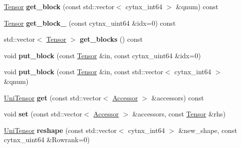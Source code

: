 \begin{DoxyCompactItemize}
\hyperlink{classcytnx_1_1Tensor}{Tensor} {\bfseries get\+\_\+block} (const std\+::vector$<$ cytnx\+\_\+int64 $>$ \&qnum) const
\item 
\mbox{\label{classcytnx_1_1UniTensor_a216d54f936554fa11b1edaff968d69d4}} 
\hyperlink{classcytnx_1_1Tensor}{Tensor} {\bfseries get\+\_\+block\+\_\+} (const cytnx\+\_\+uint64 \&idx=0) const
\item 
\mbox{\label{classcytnx_1_1UniTensor_a661bc7073dc51b16a4b9802bbcc3cba2}} 
std\+::vector$<$ \hyperlink{classcytnx_1_1Tensor}{Tensor} $>$ {\bfseries get\+\_\+blocks} () const
\item 
\mbox{\label{classcytnx_1_1UniTensor_abcd3008bf05771f0623ce1ef80b1085a}} 
void {\bfseries put\+\_\+block} (const \hyperlink{classcytnx_1_1Tensor}{Tensor} \&in, const cytnx\+\_\+uint64 \&idx=0)
\item 
\mbox{\label{classcytnx_1_1UniTensor_a9bf19662043d456a89a8e51215c67beb}} 
void {\bfseries put\+\_\+block} (const \hyperlink{classcytnx_1_1Tensor}{Tensor} \&in, const std\+::vector$<$ cytnx\+\_\+int64 $>$ \&qnum)
\item 
\mbox{\label{classcytnx_1_1UniTensor_a2e2d7f3137bb1cfb26e6a19acbc9563e}} 
\hyperlink{classcytnx_1_1UniTensor}{Uni\+Tensor} {\bfseries get} (const std\+::vector$<$ \hyperlink{classcytnx_1_1Accessor}{Accessor} $>$ \&accessors) const
\item 
\mbox{\label{classcytnx_1_1UniTensor_a90ba42a96ac324dfea7436d383fecc79}} 
void {\bfseries set} (const std\+::vector$<$ \hyperlink{classcytnx_1_1Accessor}{Accessor} $>$ \&accessors, const \hyperlink{classcytnx_1_1Tensor}{Tensor} \&rhs)
\item 
\mbox{\label{classcytnx_1_1UniTensor_a6c749dc601952c239225903371ddb669}} 
\hyperlink{classcytnx_1_1UniTensor}{Uni\+Tensor} {\bfseries reshape} (const std\+::vector$<$ cytnx\+\_\+int64 $>$ \&new\+\_\+shape, const cytnx\+\_\+uint64 \&Rowrank=0)
\item 
\mbox{\label{classcytnx_1_1UniTensor_aa1047de2e99ac2abd79ff4f74145d543}} 

\end{DoxyCompactItemize}
